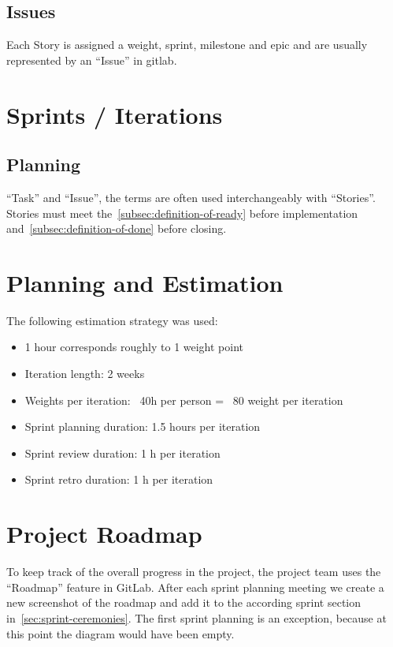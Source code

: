 \subsection{Issues}\label{subsec:issue} Each Story is assigned a weight, sprint, milestone and epic and are usually represented by an \enquote{Issue} in gitlab.

\section{Sprints / Iterations}\label{sec:sprints-iterations}

\subsection{Planning}\label{subsec:planning}
\enquote{Task} and \enquote{Issue}, the terms are often used interchangeably with \enquote{Stories}.
Stories must meet the~\ref{subsec:definition-of-ready} before implementation and~\ref{subsec:definition-of-done} before closing.

\section{Planning and Estimation}\label{sec:planning-and-estimation}

The following estimation strategy was used:

\begin{itemize}
	\item 1 hour corresponds roughly to 1 weight point
	\item Iteration length: 2 weeks
	\item Weights per iteration: ~40h per person = ~80 weight per iteration
	\item Sprint planning duration: 1.5 hours per iteration
	\item Sprint review duration: 1 h per iteration
	\item Sprint retro duration: 1 h per iteration
\end{itemize}

\section{Project Roadmap}\label{sec:project-roadmap}

To keep track of the overall progress in the project, the project team uses the \enquote{Roadmap} feature in GitLab.
After each sprint planning meeting we create a new screenshot of the roadmap and add it to the according sprint section in~\ref{sec:sprint-ceremonies}.
The first sprint planning is an exception, because at this point the diagram would have been empty.




